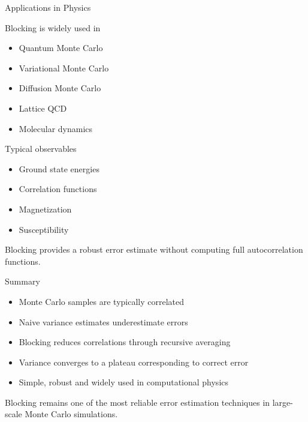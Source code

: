 \documentclass{beamer}
\begin{document}
\begin{frame}{Applications in Physics}

  Blocking is widely used in

  \begin{itemize}

  \item Quantum Monte Carlo
  \item Variational Monte Carlo
  \item Diffusion Monte Carlo
  \item Lattice QCD
  \item Molecular dynamics

  \end{itemize}

  Typical observables

  \begin{itemize}

  \item Ground state energies
  \item Correlation functions
  \item Magnetization
  \item Susceptibility

  \end{itemize}

  Blocking provides a robust error estimate without computing full autocorrelation functions.
\end{frame}


\begin{frame}{Summary}

  \begin{itemize}

  \item Monte Carlo samples are typically correlated
  \item Naive variance estimates underestimate errors
  \item Blocking reduces correlations through recursive averaging
  \item Variance converges to a plateau corresponding to correct error
  \item Simple, robust and widely used in computational physics

  \end{itemize}

  Blocking remains one of the most reliable error estimation techniques in large-scale Monte Carlo simulations.
\end{frame}

\end{document}
